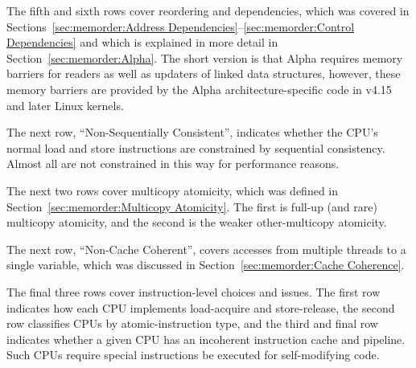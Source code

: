 The fifth and sixth rows cover reordering and dependencies,
which was covered in
Sections~\ref{sec:memorder:Address Dependencies}--\ref{sec:memorder:Control Dependencies}
and which is explained in more detail in
Section~\ref{sec:memorder:Alpha}.
The short version is that Alpha requires memory barriers for readers
as well as updaters of linked data structures, however, these memory
barriers are provided by the Alpha architecture-specific code in
v4.15 and later Linux kernels.

The next row, ``Non-Sequentially Consistent'', indicates whether
the CPU's normal load and store instructions are constrained by
sequential consistency.
Almost all are not constrained in this way for performance reasons.

The next two rows cover multicopy atomicity, which was defined in
Section~\ref{sec:memorder:Multicopy Atomicity}.
The first is full-up (and rare) multicopy atomicity, and the second is the
weaker other-multicopy atomicity.

The next row, ``Non-Cache Coherent'', covers accesses from multiple
threads to a single variable, which was discussed in
Section~\ref{sec:memorder:Cache Coherence}.

The final three rows cover instruction-level choices and issues.
The first row indicates how each CPU implements load-acquire
and store-release, the second row classifies CPUs by atomic-instruction
type, and the third and final row
indicates whether a given CPU has an incoherent
instruction cache and pipeline.
Such CPUs require special instructions be executed for self-modifying
code.


